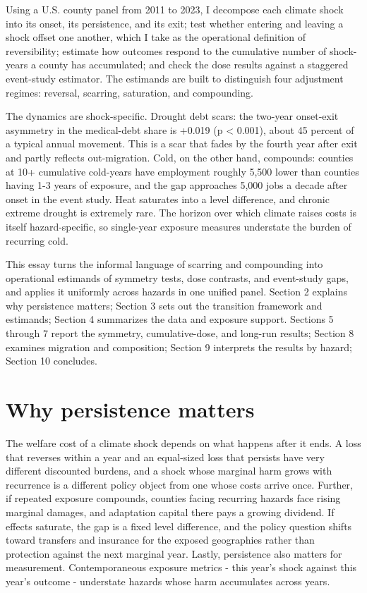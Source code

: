 \documentclass[a4paper,11pt]{report}
\begin{document}
Using a U.S. county panel from 2011 to 2023, I decompose each climate shock into its onset, its persistence, and its exit; test whether entering and leaving a shock offset one another, which I take as the operational definition of reversibility; estimate how outcomes respond to the cumulative number of shock-years a county has accumulated; and check the dose results against a staggered event-study estimator. The estimands are built to distinguish four adjustment regimes: reversal, scarring, saturation, and compounding.

The dynamics are shock-specific. Drought debt scars: the two-year onset-exit asymmetry in the medical-debt share is +0.019 (p < 0.001), about 45 percent of a typical annual movement. This is a scar that fades by the fourth year after exit and partly reflects out-migration. Cold, on the other hand, compounds: counties at 10+ cumulative cold-years have employment roughly 5,500 lower than counties having 1-3 years of exposure, and the gap approaches 5,000 jobs a decade after onset in the event study. Heat saturates into a level difference, and chronic extreme drought is extremely rare. The horizon over which climate raises costs is itself hazard-specific, so single-year exposure measures understate the burden of recurring cold.

This essay turns the informal language of scarring and compounding into operational estimands of symmetry tests, dose contrasts, and event-study gaps, and applies it uniformly across hazards in one unified panel. Section 2 explains why persistence matters; Section 3 sets out the transition framework and estimands; Section 4 summarizes the data and exposure support. Sections 5 through 7 report the symmetry, cumulative-dose, and long-run results; Section 8 examines migration and composition; Section 9 interprets the results by hazard; Section 10 concludes.

\FloatBarrier
\section{Why persistence matters}

The welfare cost of a climate shock depends on what happens after it ends. A loss that reverses within a year and an equal-sized loss that persists have very different discounted burdens, and a shock whose marginal harm grows with recurrence is a different policy object from one whose costs arrive once. Further, if repeated exposure compounds, counties facing recurring hazards face rising marginal damages, and adaptation capital there pays a growing dividend. If effects saturate, the gap is a fixed level difference, and the policy question shifts toward transfers and insurance for the exposed geographies rather than protection against the next marginal year. Lastly, persistence also matters for measurement. Contemporaneous exposure metrics - this year's shock against this year's outcome - understate hazards whose harm accumulates across years. \citep{delljonesolken2012temperature}
\end{document}
